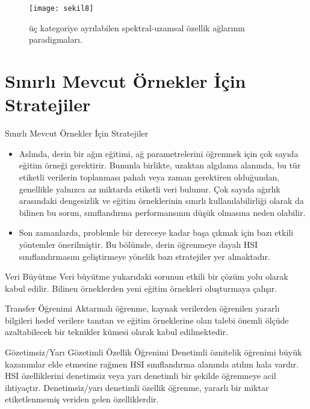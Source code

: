 \documentclass{beamer}
\begin{document}
\begin{frame}
\begin{figure}[]
  \centering
  \texttt{[image: sekil8]}
  \label{fig:sekil4}
  \caption{üç kategoriye ayrılabilen spektral-uzamsal özellik ağlarının paradigmaları.}
\end{figure}
\end{frame}

\section{Sınırlı Mevcut Örnekler İçin Stratejiler}
\begin{frame}{Sınırlı Mevcut Örnekler İçin Stratejiler}
\begin{itemize}
  \item Aslında, derin bir ağın eğitimi, ağ parametrelerini öğrenmek için çok sayıda eğitim örneği gerektirir. Bununla birlikte, uzaktan algılama alanında, bu tür etiketli verilerin toplanması pahalı veya zaman gerektiren olduğundan, genellikle yalnızca az miktarda etiketli veri bulunur. Çok sayıda ağırlık arasındaki dengesizlik ve eğitim örneklerinin sınırlı kullanılabilirliği olarak da bilinen bu sorun, sınıflandırma performansının düşük olmasına neden olabilir. 

  \item Son zamanlarda, problemle bir dereceye kadar başa çıkmak için bazı etkili yöntemler önerilmiştir. Bu bölümde, derin öğrenmeye dayalı HSI sınıflandırmasını geliştirmeye yönelik bazı stratejiler yer almaktadır.
\end{itemize}
\end{frame}

\begin{frame}{Veri Büyütme}
Veri büyütme yukarıdaki sorunun etkili bir çözüm yolu olarak kabul edilir. Bilinen örneklerden yeni eğitim örnekleri oluşturmaya çalışır.
\end{frame}

\begin{frame}{Transfer Öğrenimi}
Aktarmalı öğrenme, kaynak verilerden öğrenilen yararlı bilgileri hedef verilere tanıtan ve eğitim örneklerine olan talebi önemli ölçüde azaltabilecek bir teknikler kümesi olarak kabul edilmektedir.
\end{frame}

\begin{frame}{Gözetimsiz/Yarı Gözetimli Özellik Öğrenimi}
Denetimli öznitelik öğrenimi büyük kazanımlar elde etmesine rağmen HSI sınıflandırma alanında atılım hala vardır. HSI özelliklerini denetimsiz veya yarı denetimli bir şekilde öğrenmeye acil ihtiyaçtır. Denetimsiz/yarı denetimli özellik öğrenme, yararlı bir miktar etiketlenmemiş veriden gelen özelliklerdir.
\end{frame}
\end{document}
